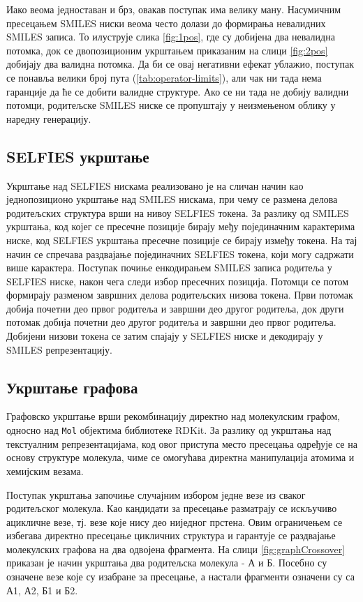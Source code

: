 \documentclass[12pt,oneside]{memoir}
\begin{document}
Иако веома једноставан и брз, овакав поступак има велику ману. 
Насумичним пресецањем SMILES ниски веома често долази до 
формирања невалидних SMILES записа. То илуструје слика 
\ref{fig:1pos}, где су добијена два невалидна потомка, док се 
двопозиционим укрштањем приказаним на слици \ref{fig:2pos} добијају 
два валидна потомка.
Да би се овај негативни ефекат 
ублажио, поступак се понавља велики број пута (\ref{tab:operator-limits}), али чак ни тада нема 
гаранције да ће се добити валидне структуре. Ако се ни тада не добију валидни потомци, родитељске SMILES ниске
се пропуштају у неизмењеном облику у наредну генерацију.

\subsection{SELFIES укрштање}
\label{selfies_crossover}

Укрштање над SELFIES нискама реализовано је на сличан начин 
као једнопозиционо укрштање над SMILES нискама, при чему се 
размена делова родитељских структура врши на нивоу SELFIES 
токена. За разлику од SMILES укрштања, код којег се пресечне 
позиције бирају међу појединачним карактерима ниске, код 
SELFIES укрштања пресечне позиције се бирају између токена. 
На тај начин се спречава раздвајање појединачних SELFIES 
токена, који могу садржати више карактера. Поступак почиње
енкодирањем SMILES записа родитеља у SELFIES ниске, након чега
следи избор пресечних позиција. Потомци се потом формирају разменом завршних делова 
родитељских низова токена. Први потомак добија почетни део 
првог родитеља и завршни део другог родитеља, док други 
потомак добија почетни део другог родитеља и завршни део првог 
родитеља. Добијени низови токена се затим спајају у SELFIES 
ниске и декодирају у SMILES репрезентацију.

\subsection{Укрштање графова}
\label{graph_crossover}

Графовско укрштање врши рекомбинацију директно над молекулским 
графом, односно над \texttt{Mol} објектима библиотеке RDKit. 
За разлику од укрштања над текстуалним репрезентацијама, код 
овог приступа место пресецања одређује се на основу структуре 
молекула, чиме се омогућава директна манипулација атомима и 
хемијским везама.

Поступак укрштања започиње случајним избором једне везе из 
сваког родитељског молекула. Као кандидати за пресецање 
разматрају се искључиво ацикличне везе, тј. везе које нису део 
ниједног прстена. 
Овим ограничењем се избегава директно пресецање цикличних 
структура и гарантује се раздвајање молекулских графова на два 
одвојена фрагмента. На слици \ref{fig:graphCrossover} приказан је начин
укрштања два родитељска молекула - А и Б. Посебно су означене
везе које су изабране за пресецање, а настали фрагменти означени су
са А1, А2, Б1 и Б2.
\end{document}
